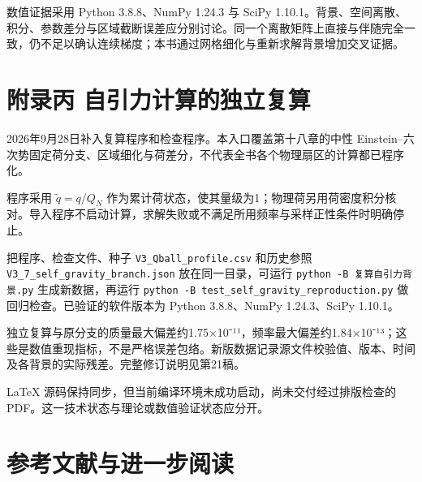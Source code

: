 \documentclass[UTF8,fontset=fandol,11pt]{ctexart}
\begin{document}
数值证据采用 Python 3.8.8、NumPy 1.24.3 与 SciPy 1.10.1。背景、空间离散、积分、参数差分与区域截断误差应分别讨论。同一个离散矩阵上直接与伴随完全一致，仍不足以确认连续梯度；本书通过网格细化与重新求解背景增加交叉证据。

\section*{附录丙 自引力计算的独立复算}

2026年9月28日补入复算程序和检查程序。本入口覆盖第十八章的中性 Einstein–六次势固定荷分支、区域细化与荷差分，不代表全书各个物理扇区的计算都已程序化。

程序采用 \(\widetilde q=q/Q_N\) 作为累计荷状态，使其量级为1；物理荷另用荷密度积分核对。导入程序不启动计算，求解失败或不满足所用频率与采样正性条件时明确停止。

把程序、检查文件、种子 \texttt{V3\_Qball\_profile.csv} 和历史参照 \texttt{V3\_7\_self\_gravity\_branch.json} 放在同一目录，可运行 \texttt{python -B 复算自引力背景.py} 生成新数据，再运行 \texttt{python -B test\_self\_gravity\_reproduction.py} 做回归检查。已验证的软件版本为 Python 3.8.8、NumPy 1.24.3、SciPy 1.10.1。

独立复算与原分支的质量最大偏差约1.75×10⁻¹¹，频率最大偏差约1.84×10⁻¹³；这些是数值重现指标，不是严格误差包络。新版数据记录源文件校验值、版本、时间及各背景的实际残差。完整修订说明见第21稿。

LaTeX 源码保持同步，但当前编译环境未成功启动，尚未交付经过排版检查的 PDF。这一技术状态与理论或数值验证状态应分开。

\section*{参考文献与进一步阅读}
\end{document}
